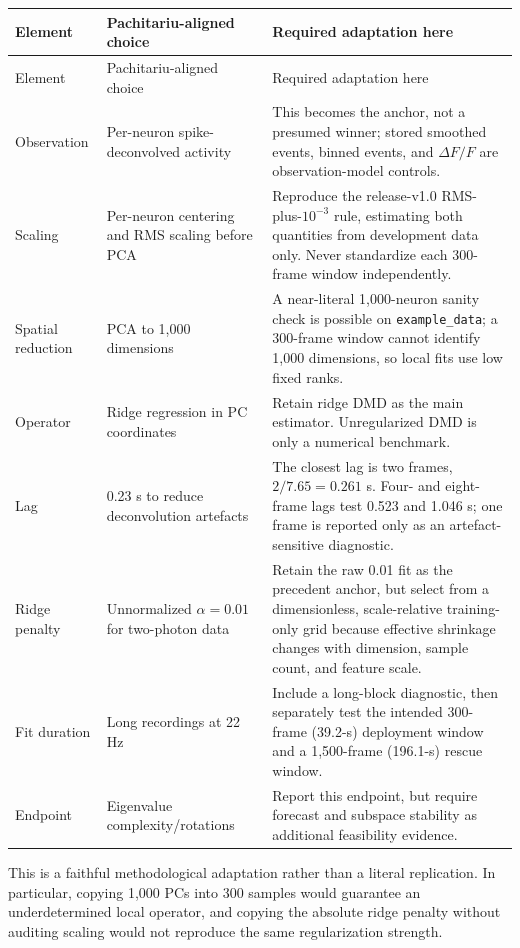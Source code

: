 \documentclass[11pt,a4paper]{article}
\begin{document}
\begin{longtable}{@{}P{0.24\textwidth}P{0.31\textwidth}P{0.37\textwidth}@{}}
\toprule
Element & Pachitariu-aligned choice & Required adaptation here\\
\midrule
\endfirsthead
\toprule
Element & Pachitariu-aligned choice & Required adaptation here\\
\midrule
\endhead
Observation & Per-neuron spike-deconvolved activity & This becomes the anchor,
not a presumed winner; stored smoothed events, binned events, and $\Delta F/F$
are observation-model controls.\\
Scaling & Per-neuron centering and RMS scaling before PCA & Reproduce the
release-v1.0 RMS-plus-$10^{-3}$ rule, estimating both quantities from development
data only. Never standardize each 300-frame window independently.\\
Spatial reduction & PCA to 1,000 dimensions & A near-literal 1,000-neuron
sanity check is possible on \texttt{example\_data}; a 300-frame window cannot
identify 1,000 dimensions, so local fits use low fixed ranks.\\
Operator & Ridge regression in PC coordinates & Retain ridge DMD as the main
estimator. Unregularized DMD is only a numerical benchmark.\\
Lag & 0.23 s to reduce deconvolution artefacts & The closest lag is two frames,
$2/7.65=0.261$ s. Four- and eight-frame lags test 0.523 and 1.046 s; one frame is
reported only as an artefact-sensitive diagnostic.\\
Ridge penalty & Unnormalized $\alpha=0.01$ for two-photon data & Retain the raw
0.01 fit as the precedent anchor, but select from a dimensionless, scale-relative
training-only grid because effective shrinkage changes with dimension, sample
count, and feature scale.\\
Fit duration & Long recordings at 22 Hz & Include a long-block diagnostic, then
separately test the intended 300-frame (39.2-s) deployment window and a
1,500-frame (196.1-s) rescue window.\\
Endpoint & Eigenvalue complexity/rotations & Report this endpoint, but require
forecast and subspace stability as additional feasibility evidence.\\
\bottomrule
\end{longtable}

This is a faithful methodological adaptation rather than a literal replication.
In particular, copying 1,000 PCs into 300 samples would guarantee an
underdetermined local operator, and copying the absolute ridge penalty without
auditing scaling would not reproduce the same regularization strength.
\end{document}
